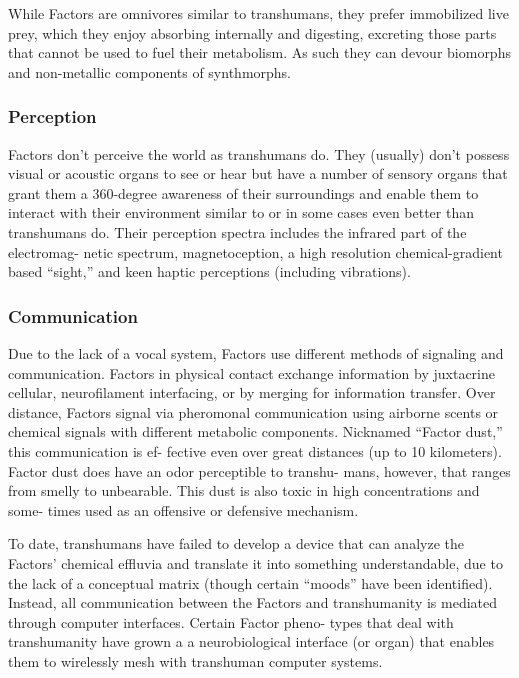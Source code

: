 While Factors are omnivores similar to transhumans, 
they prefer immobilized live prey, which they enjoy 
absorbing internally and digesting, excreting those 
parts that cannot be used to fuel their metabolism. 
As such they can devour biomorphs and non-metallic 
components of synthmorphs.

\subsubsection{Perception }

Factors don't perceive the world as transhumans 
do. They (usually) don't possess visual or acoustic 
organs to see or hear but have a number of sensory 
organs that grant them a 360-degree awareness of 
their surroundings and enable them to interact 
with their environment similar to or in some cases 
even better than transhumans do. Their perception 
spectra includes the infrared part of the electromag-
netic spectrum, magnetoception, a high resolution 
chemical-gradient based ``sight,'' and keen haptic 
perceptions (including vibrations). 

\subsubsection{Communication }

Due to the lack of a vocal system, Factors use different 
methods of signaling and communication. Factors in 
physical contact exchange information by juxtacrine 
cellular, neurofilament interfacing, or by merging for 
information transfer. Over distance, Factors signal via 
pheromonal communication using airborne scents or 
chemical signals with different metabolic components. 
Nicknamed ``Factor dust,'' this communication is ef-
fective even over great distances (up to 10 kilometers). 
Factor dust does have an odor perceptible to transhu-
mans, however, that ranges from smelly to unbearable. 
This dust is also toxic in high concentrations and some-
times used as an offensive or defensive mechanism.

To date, transhumans have failed to develop a device 
that can analyze the Factors' chemical effluvia and 
translate it into something understandable, due to the 
lack of a conceptual matrix (though certain ``moods'' 
have been identified). Instead, all communication 
between the Factors and transhumanity is mediated 
through computer interfaces. Certain Factor pheno-
types that deal with transhumanity have grown a a 
neurobiological interface (or organ) that enables them 
to wirelessly mesh with transhuman computer systems.


